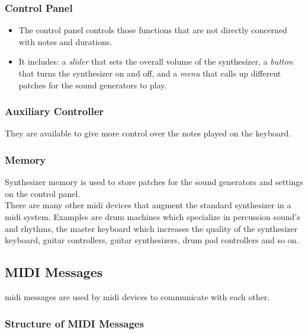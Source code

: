 \subsubsection*{Control Panel}
\begin{itemize}
	\item The control panel controls those functions that are not directly
	concerned with notes and durations. 
	\item It includes: 
		\subitem a \textit{slider} that sets the overall volume of the synthesizer, 
		\subitem a \textit{button} that turns the synthesizer on and off, and 
	\subitem a \textit{menu} that calls up different patches for the sound
	generators to play.
\end{itemize}


\subsubsection*{Auxiliary Controller}
They are available to give more control over the notes played on the
keyboard.

\subsubsection*{Memory}
Synthesizer memory is used to store patches for the sound generators
and settings on the control panel.\\

\noindent There are many other \gls{midi} devices that augment the standard synthesizer in a \gls{midi} system. Examples are drum machines which specialize in percussion sound's and rhythms, the master keyboard which increases the quality of the synthesizer keyboard, guitar controllers, guitar synthesizers, drum pad controllers and so on.

\subsection[Messages]{MIDI Messages}
 \gls{midi} messages are used by \gls{midi} devices to communicate with each other.
 
 \subsubsection*{Structure of MIDI Messages} 

